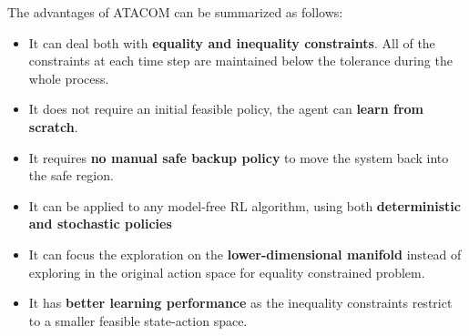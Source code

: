 



The advantages of ATACOM can be summarized as follows:
\begin{itemize}
    \item It can deal both with \textbf{equality and inequality constraints}. All of the constraints at each time step are maintained
    below the tolerance during the whole process.
    \item It does not require an initial feasible policy, the agent can \textbf{learn from scratch}.
    \item It requires \textbf{no manual safe backup policy} to move the system back into the safe region.
    \item It can be applied to any model-free RL algorithm, using both \textbf{deterministic and stochastic policies}
    \item It can focus the exploration on the \textbf{lower-dimensional manifold} instead of exploring in the original action space
    for equality constrained problem.
    \item It has \textbf{better learning performance} as the inequality constraints restrict to a smaller feasible state-action space.
\end {itemize}


